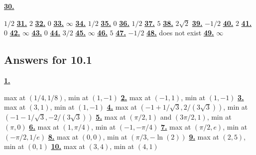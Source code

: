 \hypertarget {a:9.3.30}{\hyperlink {e:9.3.30}{\bfseries 30.}} \mdseries $1/2$\qquad 
\hypertarget {a:9.3.31}{\hyperlink {e:9.3.31}{\bfseries 31.}} \mdseries $2$\qquad 
\hypertarget {a:9.3.32}{\hyperlink {e:9.3.32}{\bfseries 32.}} \mdseries $0$\qquad 
\hypertarget {a:9.3.33}{\hyperlink {e:9.3.33}{\bfseries 33.}} \mdseries $\infty $\qquad 
\hypertarget {a:9.3.34}{\hyperlink {e:9.3.34}{\bfseries 34.}} \mdseries $1/2$\qquad 
\hypertarget {a:9.3.35}{\hyperlink {e:9.3.35}{\bfseries 35.}} \mdseries $0$\qquad 
\hypertarget {a:9.3.36}{\hyperlink {e:9.3.36}{\bfseries 36.}} \mdseries $1/2$\qquad 
\hypertarget {a:9.3.37}{\hyperlink {e:9.3.37}{\bfseries 37.}} \mdseries $5$\qquad 
\hypertarget {a:9.3.38}{\hyperlink {e:9.3.38}{\bfseries 38.}} \mdseries $2\sqrt 2$\qquad 
\hypertarget {a:9.3.39}{\hyperlink {e:9.3.39}{\bfseries 39.}} \mdseries $-1/2$\qquad 
\hypertarget {a:9.3.40}{\hyperlink {e:9.3.40}{\bfseries 40.}} \mdseries $2$\qquad 
\hypertarget {a:9.3.41}{\hyperlink {e:9.3.41}{\bfseries 41.}} \mdseries $0$\qquad 
\hypertarget {a:9.3.42}{\hyperlink {e:9.3.42}{\bfseries 42.}} \mdseries $\infty $\qquad 
\hypertarget {a:9.3.43}{\hyperlink {e:9.3.43}{\bfseries 43.}} \mdseries $0$\qquad 
\hypertarget {a:9.3.44}{\hyperlink {e:9.3.44}{\bfseries 44.}} \mdseries $3/2$\qquad 
\hypertarget {a:9.3.45}{\hyperlink {e:9.3.45}{\bfseries 45.}} \mdseries $\infty $\qquad 
\hypertarget {a:9.3.46}{\hyperlink {e:9.3.46}{\bfseries 46.}} \mdseries $5$\qquad 
\hypertarget {a:9.3.47}{\hyperlink {e:9.3.47}{\bfseries 47.}} \mdseries $-1/2$\qquad 
\hypertarget {a:9.3.48}{\hyperlink {e:9.3.48}{\bfseries 48.}} \mdseries does not exist\qquad 
\hypertarget {a:9.3.49}{\hyperlink {e:9.3.49}{\bfseries 49.}} \mdseries $\infty $\qquad 
\subsection *{Answers for 10.1}
\hypertarget {a:10.1.1}{\hyperlink {e:10.1.1}{\bfseries 1.}} \mdseries max at $(1/4,1/8)$, min at $(1,-1)$\qquad 
\hypertarget {a:10.1.2}{\hyperlink {e:10.1.2}{\bfseries 2.}} \mdseries max at $(-1,1)$, min at $(1,-1)$\qquad 
\hypertarget {a:10.1.3}{\hyperlink {e:10.1.3}{\bfseries 3.}} \mdseries max at $(3,1)$, min at $(1,-1)$\qquad 
\hypertarget {a:10.1.4}{\hyperlink {e:10.1.4}{\bfseries 4.}} \mdseries max at $(-1+1/\sqrt {3},2/(3\sqrt {3}))$, min at $(-1-1/\sqrt {3},-2/(3\sqrt {3}))$\qquad 
\hypertarget {a:10.1.5}{\hyperlink {e:10.1.5}{\bfseries 5.}} \mdseries max at $(\pi /2,1)$ and $(3\pi /2,1)$, min at $(\pi ,0)$\qquad 
\hypertarget {a:10.1.6}{\hyperlink {e:10.1.6}{\bfseries 6.}} \mdseries max at $(1,\pi /4)$, min at $(-1,-\pi /4)$\qquad 
\hypertarget {a:10.1.7}{\hyperlink {e:10.1.7}{\bfseries 7.}} \mdseries max at $(\pi /2,e)$, min at $(-\pi /2,1/e)$\qquad 
\hypertarget {a:10.1.8}{\hyperlink {e:10.1.8}{\bfseries 8.}} \mdseries max at $(0,0)$, min at $(\pi /3,-\ln (2))$\qquad 
\hypertarget {a:10.1.9}{\hyperlink {e:10.1.9}{\bfseries 9.}} \mdseries max at $(2,5)$, min at $(0,1)$\qquad 
\hypertarget {a:10.1.10}{\hyperlink {e:10.1.10}{\bfseries 10.}} \mdseries max at $(3,4)$, min at $(4,1)$\qquad 
